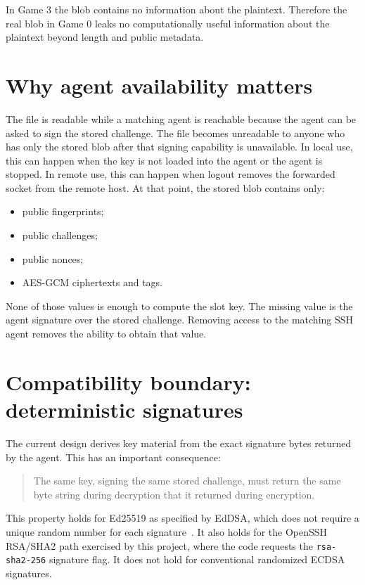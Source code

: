 \documentclass[11pt]{article}
\theoremstyle{definition}
\theoremstyle{plain}
\begin{document}
In Game 3 the blob contains no information about the plaintext. Therefore the real blob in Game 0 leaks no computationally useful information about the plaintext beyond length and public metadata.

\section{Why agent availability matters}

The file is readable while a matching agent is reachable because the agent can be asked to sign the stored challenge. The file becomes unreadable to anyone who has only the stored blob after that signing capability is unavailable. In local use, this can happen when the key is not loaded into the agent or the agent is stopped. In remote use, this can happen when logout removes the forwarded socket from the remote host. At that point, the stored blob contains only:

\begin{itemize}[leftmargin=*]
  \item public fingerprints;
  \item public challenges;
  \item public nonces;
  \item AES-GCM ciphertexts and tags.
\end{itemize}

None of those values is enough to compute the slot key. The missing value is the agent signature over the stored challenge. Removing access to the matching SSH agent removes the ability to obtain that value.

\section{Compatibility boundary: deterministic signatures}

The current design derives key material from the exact signature bytes returned by the agent. This has an important consequence:

\begin{quote}
The same key, signing the same stored challenge, must return the same byte string during decryption that it returned during encryption.
\end{quote}

This property holds for Ed25519 as specified by EdDSA, which does not require a unique random number for each signature~\cite{rfc8032}. It also holds for the OpenSSH RSA/SHA2 path exercised by this project, where the code requests the \texttt{rsa-sha2-256} signature flag. It does not hold for conventional randomized ECDSA signatures.
\end{document}

